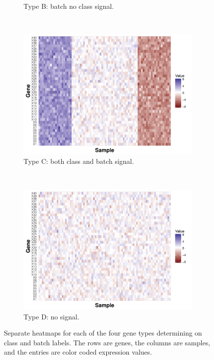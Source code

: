 \documentclass[11pt]{article}
\begin{document}
\begin{figure}[h!]
\begin{subfigure}[t]{0.4\textwidth}
    \caption{Type B: batch no class signal.}
    \label{fig:type_b}
    \end{subfigure}
    \\
    \centering
    \begin{subfigure}[t]{0.4\textwidth}
    \includegraphics[width = \textwidth]{figures/Type_C_Gene.pdf}
    \caption{Type C: both class and batch signal.}
     \label{fig:type_c}
   \end{subfigure}
    ~
    \centering
    \begin{subfigure}[t]{0.4\textwidth}
    \includegraphics[width = \textwidth]{figures/Type_D_Gene.pdf}
    \caption{Type D: no signal.}
    \label{fig:type_d}
    \end{subfigure}
    \caption{Separate heatmaps for each of the four gene types determining on class and batch labels. The rows are genes, the columns are samples, and the entries are color coded expression values.}
    \label{fig:heatmap}
\end{figure}
\end{document}
